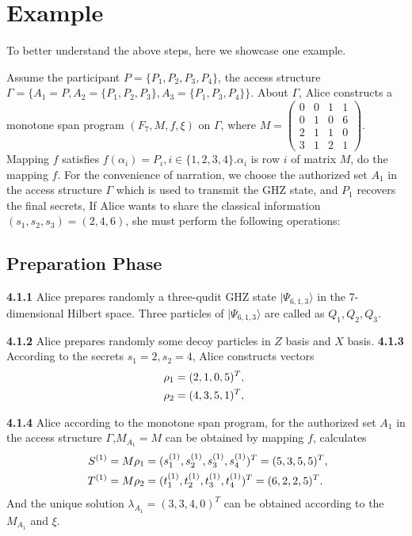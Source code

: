 \documentclass[pdflatex,sn-mathphys]{sn-jnl}%
\theoremstyle{thmstyleone}%
\theoremstyle{thmstyletwo}%
\theoremstyle{thmstylethree}%
\begin{document}
\section{Example}\label{sec4}
To better understand the above steps, here we showcase one example.

Assume the participant $P=\lbrace{P_1,P_2,P_3,P_4}\rbrace$, the access structure $\varGamma=\lbrace A_1=P,A_2=\lbrace{P_1,P_2,P_3}\rbrace,A_3=\lbrace{P_1,P_3,P_4}\rbrace \rbrace$. About $\varGamma$, Alice constructs a monotone span program $(F_7,M,f,\xi)$ on $\varGamma$, where $M=\begin{pmatrix}
    0 & 0 & 1 & 1 \\
    0 & 1 & 0 & 6 \\
    2 & 1 & 1 & 0 \\
    3 & 1 & 2 & 1
\end{pmatrix}$. Mapping $f$ satisfies $f(\alpha_i)=P_i,i\in\lbrace{1,2,3,4}\rbrace$.$\alpha_i$ is row $i$ of matrix $M$, do the mapping $f$. For the convenience of narration, we choose the authorized set $A_1$ in the access structure $\varGamma$ which is used to transmit the GHZ state, and $P_1$ recovers the final secrets, If Alice wants to share the classical information $(s_1,s_2,s_3)=(2,4,6)$, she must perform the following operations:  

\subsection{Preparation Phase}\label{subsec1}

\textbf{4.1.1} Alice prepares randomly a three-qudit GHZ state $\mid\varPsi_{6,1,3}\rangle$ in the 7-dimensional Hilbert space. Three particles of $\mid\varPsi_{6,1,3}\rangle$ are called as $Q_1,Q_2,Q_3$.

\indent\textbf{4.1.2} Alice prepares randomly some decoy particles in $Z$ basis and $X$ basis.
\indent\textbf{4.1.3} According to the secrets $s_1=2,s_2=4$, Alice constructs vectors
\begin{align}
 \rho_1 &=(2,1,0,5)^T,\notag\\
 \rho_2 &=(4,3,5,1)^T,\notag\
\end{align}

\indent\textbf{4.1.4} Alice according to the monotone span program, for the authorized set $A_1$ in the access structure $\varGamma$,$M_{A_1}=M$ can be obtained by mapping $f$, calculates
\begin{align}
 \ S^{(1)} &=M\rho_1=(s_1^{(1)},s_2^{(1)},s_3^{(1)},s_4^{(1)})^T=(5,3,5,5)^T,\notag\\
 \ T^{(1)} &=M\rho_2=(t_1^{(1)},t_2^{(1)},t_3^{(1)},t_4^{(1)})^T=(6,2,2,5)^T.\notag\
\end{align}
And the unique solution $\lambda_{A_1}=(3,3,4,0)^T$ can be obtained according to the $M_{A_1}$ and $\xi$.
\end{document}
